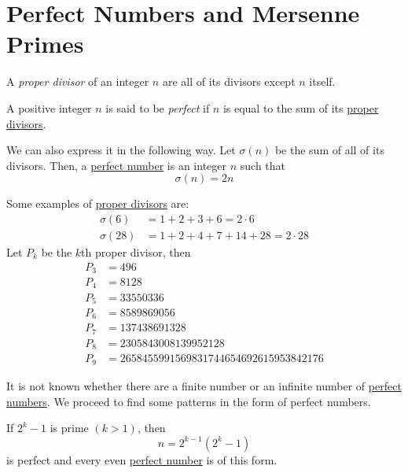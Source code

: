 \documentclass{article}
\newcounter{theorem}[section]
\newcounter{definition}[section]
\newcounter{example}[section]
\begin{document}
\section{Perfect Numbers and Mersenne Primes}
\begin{definition}
  \label{def:proper-divisor}
A \textit{proper divisor} of an integer $n$ are all of its divisors except $n$ itself. 
\end{definition}

\begin{definition}
  \label{def:perfect-number}
A positive integer $n$ is said to be \textit{perfect} if $n$ is equal to the sum of its \hyperref[def:proper-divisor]{proper divisors}. 
\end{definition}

We can also express it in the following way. Let $\sigma(n)$ be the sum of all of its divisors. Then, a \hyperref[def:perfect-number]{perfect number} is an integer $n$ such that
\begin{equation}
  \sigma(n) = 2n
\end{equation}

\begin{example}
  \label{ex:divisor-sums-of-perfect-numbers}
Some examples of \hyperref[def:proper-divisor]{proper divisors} are: 
\begin{align*}
    \sigma(6) & = 1 + 2 + 3 + 6 = 2 \cdot 6 \\
    \sigma(28) & = 1 + 2 + 4+ 7+ 14+ 28 = 2 \cdot 28
\end{align*}
Let $P_k$ be the $k$th proper divisor, then 
\begin{align*}
    P_3 & = 496 \\
    P_4 & = 8128 \\
    P_5 & = 33550336 \\
    P_6 & = 8589869056 \\
    P_7 & = 137438691328 \\
    P_8 & = 2305843008139952128 \\
    P_9 & = 2658455991569831744654692615953842176
\end{align*}
\end{example}

It is not known whether there are a finite number or an infinite number of \hyperref[def:perfect-number]{perfect numbers}. We proceed to find some patterns in the form of perfect numbers. 

\begin{theorem}
  \label{thm:euclid-euler-theorem-on-even-perfect-numbers}
If $2^k - 1$ is prime $(k > 1)$, then 
\begin{equation}
  n = 2^{k-1} (2^k - 1)
\end{equation}
is perfect and every even \hyperref[def:perfect-number]{perfect number} is of this form. 
\end{theorem}
\end{document}

